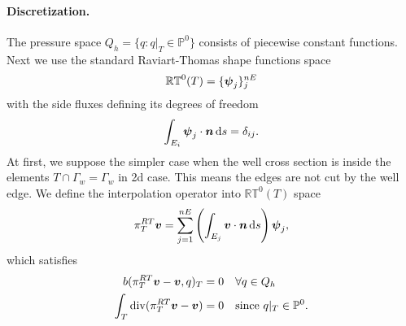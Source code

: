 \paragraph{Discretization.}
The pressure space $Q_h=\{q: q|_T\in \mathbb{P}^0\}$ consists of piecewise constant functions.
Next we use the standard Raviart-Thomas shape functions space
\begin{equation}
    \mathbb{RT}^0(T) = \{\mathbf{\boldsymbol{\psi}}_j\}_j^{nE}
\end{equation}
with the side fluxes defining its degrees of freedom
\begin{equation}
    \int_{E_i} \mathbf{\boldsymbol{\psi}}_j \cdot \mathbf{\boldsymbol{n}} \,\mathrm{d} s = \delta_{ij}.
\end{equation}
At first, we suppose the simpler case when the well cross section is
inside the elements $T\cap\Gamma_w = \Gamma_w$ in 2d case.
This means the edges are not cut by the well edge.
We define the interpolation operator into $\mathbb{RT}^0(T)$ space
\begin{equation}
    \pi^{RT}_T\mathbf{\boldsymbol{v}} = \sum_{j=1}^{nE} \left( \int_{E_j} \mathbf{\boldsymbol{v}} \cdot \mathbf{\boldsymbol{n}} \,\mathrm{d} s \right)  \mathbf{\boldsymbol{\psi}}_j, \label{eqn:local_rt_interpolator}
\end{equation}
which satisfies
\begin{align}
b(\pi^{RT}_T\mathbf{\boldsymbol{v}}- \mathbf{\boldsymbol{v}}, q)_T &= 0 \quad \forall q\in Q_h\\ 
\int_T {\rm div}(\pi^{RT}_T\mathbf{\boldsymbol{v}}- \mathbf{\boldsymbol{v}}) &= 0 \quad \textrm{since } q|_T\in \mathbb{P}^0.
\end{align}


